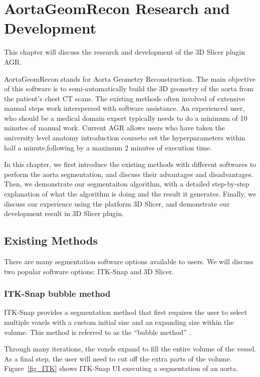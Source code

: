 \chapter{AortaGeomRecon Research and Development}

This chapter will discuss the research and development of the 3D Slicer plugin AGR.

AortaGeomRecon stands for Aorta Geometry Reconstruction. The main objective of this software is to semi-automatically build the 3D geometry of the aorta from the patient's chest CT scans.  The existing methods often involved of extensive manual steps work interspersed with software assistance. An experienced user, who should be a medical domain expert typically needs to do a minimum of 10 minutes of manual work.
Current AGR allows users who have taken the university level anatomy introduction courseto set the hyperparameters within half a minute,following by a maximum 2 minutes of execution time.

In this chapter, we first introduce the existing methods with different softwares to perform the aorta segmentation, and discuss their advantages and disadvantages. Then, we demonstrate our segmentaiton algorithm, with a detailed step-by-step explanation of what the algorithm is doing and the result it generates. Finally, we discuss our experience using the platform 3D Slicer, and demonstrate our development result in 3D Slicer plugin.

\section{Existing Methods}
There are many segmentation software options available to users. We will discuss two popular software options: ITK-Snap and 3D Slicer.

\subsection{ITK-Snap bubble method} 
\indent
ITK-Snap provides a segmentation method that first requires the user to select multiple voxels with a custom initial size and an expanding size within the volume. This method is referred to as the ``bubble method'' \cite{gerig}.

Through many iterations, the voxels expand to fill the entire volume of the vessel. As a final step, the user will need to cut off the extra parts of the volume. Figure~\ref{fig_ITK} shows ITK-Snap UI executing a segmentation of an aorta.

